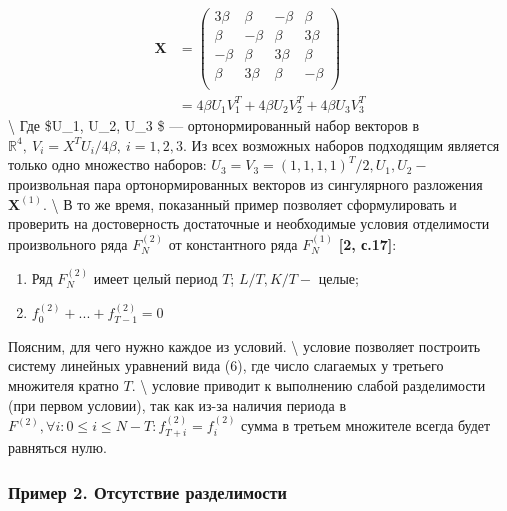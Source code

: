 \documentclass[
]{article}
\begin{document}
\begin{align*}
    \textbf{X} & =
    \begin{pmatrix}
        3\beta & \beta & -\beta & \beta \\
        \beta & -\beta & \beta & 3\beta \\
        -\beta & \beta & 3\beta & \beta \\
        \beta & 3\beta & \beta & -\beta \\
    \end{pmatrix}
    \\ & = 4\beta U_1V_1^T + 4\beta U_2V_2^T + 4\beta U_3V_3^T
\end{align*} \textbackslash{} Где \$U\_1, U\_2, U\_3 \$ ---
ортонормированный набор векторов в
\(\mathbb{R}^4, \ V_i = X^TU_i/4\beta, \ i = 1,2,3.\) Из всех возможных
наборов подходящим является только одно множество наборов:
\(U_3 = V_3 = (1, 1, 1, 1)^T/2, U_1, U_2 -\) произвольная пара
ортонормированных векторов из сингулярного разложения
\(\textbf{X}^{(1)}\). \textbackslash{} В то же время, показанный пример
позволяет сформулировать и проверить на достоверность достаточные и
необходимые условия отделимости произвольного ряда \(F^{(2)}_N\) от
константного ряда \(F^{(1)}_N\) \textbf{[2, с.17]}:

\begin{enumerate}
    \item Ряд $F^{(2)}_N$ имеет целый период $T$; $L/T, K/T - $ целые;
    \item $f_0^{(2)}+... + f_{T-1}^{(2)} = 0$
\end{enumerate}

Поясним, для чего нужно каждое из условий. \textbackslash{}
 условие позволяет построить систему линейных уравнений
вида (6), где число слагаемых у третьего множителя кратно \(T\).
\textbackslash{}  условие приводит к выполнению слабой
разделимости (при первом условии), так как из-за наличия периода в
\(F^{(2)}, \forall i: 0 \leq i \leq N - T: f^{(2)}_{T+i}=f^{(2)}_i\)
сумма в третьем множителе всегда будет равняться нулю.

\subsubsection{Пример 2. Отсутствие разделимости}
\end{document}

